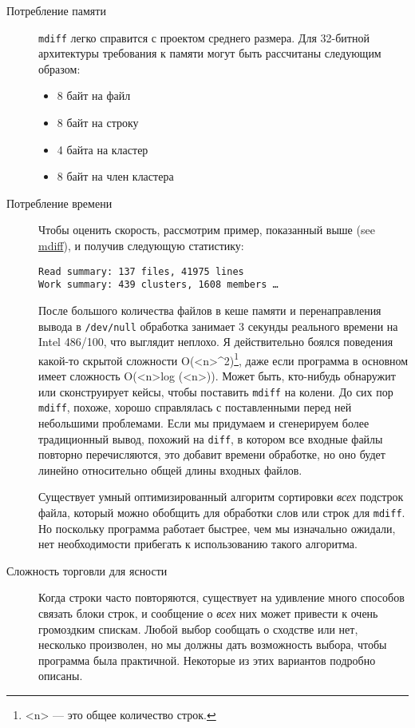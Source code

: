 \begin{description}
\item[Потребление памяти]
\texttt{mdiff} легко справится с проектом среднего размера. Для
32-битной архитектуры требования к памяти могут быть рассчитаны
следующим образом:

\begin{itemize}
\item
  8 байт на файл
\item
  8 байт на строку
\item
  4 байта на кластер
\item
  8 байт на член кластера
\end{itemize}
\item[Потребление времени]
Чтобы оценить скорость, рассмотрим пример, показанный выше (see
\protect\hyperlink{mdiff}{mdiff}), и получив следующую статистику:

\begin{verbatim}
Read summary: 137 files, 41975 lines
Work summary: 439 clusters, 1608 members …
\end{verbatim}

После большого количества файлов в кеше памяти и перенаправления вывода
в \texttt{/dev/null} обработка занимает 3 секунды реального времени на
Intel 486/100, что выглядит неплохо. Я действительно боялся поведения
какой-то скрытой сложности O(\textless n\textgreater\^{}2)\footnote{\textless n\textgreater{}
  --- это общее количество строк.}, даже если программа в основном имеет
сложность O(\textless n\textgreater*log (\textless n\textgreater)).
Может быть, кто-нибудь обнаружит или сконструирует кейсы, чтобы
поставить \texttt{mdiff} на колени. До сих пор \texttt{mdiff}, похоже,
хорошо справлялась с поставленными перед ней небольшими проблемами. Если
мы придумаем и сгенерируем более традиционный вывод, похожий на
\texttt{diff}, в котором все входные файлы повторно перечисляются, это
добавит времени обработке, но оно будет линейно относительно общей длины
входных файлов.

Существует умный оптимизированный алгоритм сортировки \emph{всех}
подстрок файла, который можно обобщить для обработки слов или строк для
\texttt{mdiff}. Но поскольку программа работает быстрее, чем мы
изначально ожидали, нет необходимости прибегать к использованию такого
алгоритма.
\item[Сложность торговли для ясности]
Когда строки часто повторяются, существует на удивление много способов
связать блоки строк, и сообщение о \emph{всех} них может привести к
очень громоздким спискам. Любой выбор сообщать о сходстве или нет,
несколько произволен, но мы должны дать возможность выбора, чтобы
программа была практичной. Некоторые из этих вариантов подробно описаны.


\end{description}
